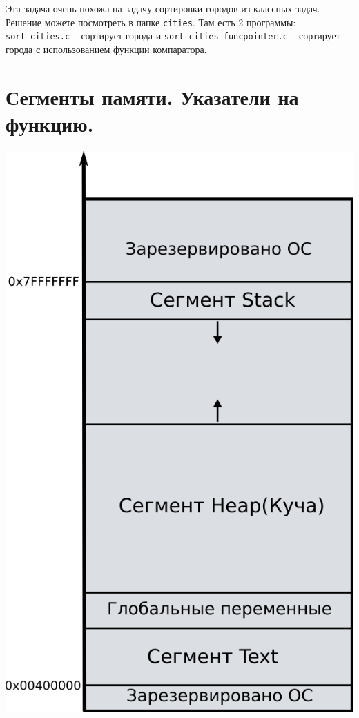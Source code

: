 \documentclass{article}
\begin{document}
\begin{itemize}
\end{itemize}

Эта задача очень похожа на задачу сортировки городов из классных задач. Решение можете посмотреть в папке \texttt{cities}. Там есть 2 программы: \texttt{sort\_cities.c} -- сортирует города и \texttt{sort\_cities\_funcpointer.c} -- сортирует города с использованием функции компаратора.

\newpage
\section*{Сегменты памяти. Указатели на функцию.}
\begin{multicols}{2}
\begin{center}
\includegraphics[scale=1.4]{../images/memory_layout.png}

\end{center}
\end{multicols}
\end{document}

